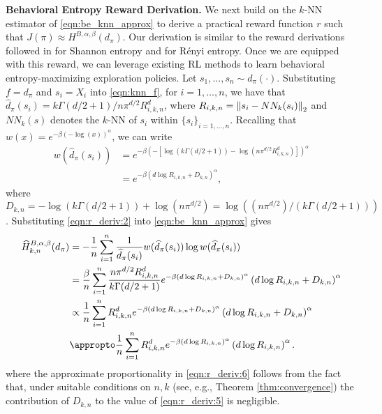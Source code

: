 \textbf{Behavioral Entropy Reward Derivation.} We next build on the $k$-NN estimator of \eqref{eqn:be_knn_approx} to derive a practical reward function $r$ such that $J(\pi) \approx H^{B,\alpha,\beta}(d_{\pi})$. Our derivation is similar to the reward derivations followed in \citep{liu2021behavior, yarats2021reinforcement} for Shannon entropy and \citep{yuan2022renyi} for R\'{e}nyi entropy. Once we are equipped with this reward, we can leverage existing RL methods to learn behavioral entropy-maximizing exploration policies.
%
Let $s_1, \ldots, s_n \sim d_{\pi}(\cdot)$. Substituting $f = d_{\pi}$ and $s_i = X_i$ into \eqref{eqn:knn_f}, for $i = 1, \ldots, n$, we have that $\widehat{d}_{\pi}(s_i) = k \Gamma(d/2 + 1) / n \pi^{d/2} R^d_{i,k,n}$, where $R_{i, k, n} = \left\lVert s_i - NN_k(s_i)\right\rVert_2$ and $NN_k(s)$ denotes the $k$-NN of $s_i$ within $\{s_i\}_{i = 1, \ldots, n}$. Recalling that $w(x) = e^{-\beta(-\log(x))^{\alpha}}$, we can write
%
\begin{align}
    w(\widehat{d}_{\pi}(s_i)) &= e^{-\beta \left( -\left[ \log(k \Gamma(d/2 + 1)) - \log(n \pi^{d/2} R_{i, k, n}^d) \right] \right)^{\alpha}} \label{eqn:r_deriv:1} \\
    &= e^{-\beta \left( d \log R_{i, k, n} + D_{k, n} \right)^\alpha}, \label{eqn:r_deriv:2}
\end{align}
%
where $D_{k,n} = - \log (k \Gamma(d/2 + 1)) + \log(n \pi^{d/2}) = \log \left( (n \pi^{d/2}) / (k \Gamma(d/2 + 1)) \right)$. Substituting \eqref{eqn:r_deriv:2} into \eqref{eqn:be_knn_approx} gives
%
\begin{align}
    \widehat{H}^{B,\alpha,\beta}_{k,n}(d_{\pi}) &= - \frac{1}{n} \sum_{i=1}^n \frac{1}{\widehat{d}_{\pi}(s_i)} w(\widehat{d}_{\pi}(s_i)) \log w(\widehat{d}_{\pi}(s_i)) \label{eqn:r_deriv:3} \\
    &= \frac{\beta}{n} \sum_{i=1}^n \frac{n \pi^{d/2} R^d_{i,k,n}}{k \Gamma(d/2 + 1)} e^{-\beta (d \log R_{i,k,n} + D_{k,n})^{\alpha}} \left( d \log R_{i,k,n} + D_{k,n} \right)^{\alpha} \label{eqn:r_deriv:4} \\
    &\propto \frac{1}{n} \sum_{i=1}^n R_{i,k,n}^d e^{-\beta ( d \log R_{i,k,n} + D_{k,n} )^{\alpha}} \left( d \log R_{i,k,n} + D_{k,n} \right)^{\alpha} \label{eqn:r_deriv:5} \\
    &\appropto \frac{1}{n} \sum_{i=1}^n R_{i,k,n}^d e^{-\beta ( d \log R_{i,k,n} )^{\alpha}} \left( d \log R_{i,k,n} \right)^{\alpha}.\label{eqn:r_deriv:6}
\end{align}
%
where the approximate proportionality in \eqref{eqn:r_deriv:6} follows from the fact that, under suitable conditions on $n, k$ (see, e.g., Theorem \ref{thm:convergence}) the contribution of $D_{k,n}$ to the value of \eqref{eqn:r_deriv:5} is negligible.
